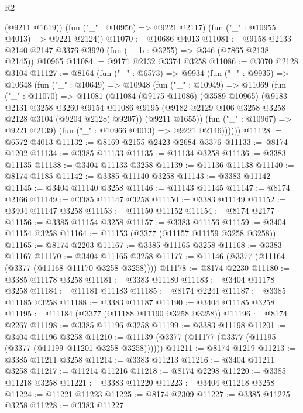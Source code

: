 \begin{lexlean}{R2}
\begin{coremodule}
        (@9211 @1619))
      (fun ("_" : @10956) => @9221 @2117)
      (fun ("_" : @10955 @4013) => @9221 @2124))
@11070 := @10686 @4013
@11081 := @9158 @2133 @2140 @2147 @3376 @3920 (fun (__b : @3255) => @346 (@7865 @2138 @2145)) @10965
@11084 := @9171 @2132 @3374 @3258
@11086 := @3070 @2128 @3104
@11127 := @8164
    (fun ("_" : @6573) =>
    @9934
      (fun ("_" : @9935) =>
      @10648
        (fun ("_" : @10649) =>
        @10948
          (fun ("_" : @10949) =>
          @11069
            (fun ("_" : @11070) =>
            @11081
              (@11084
                (@9175 @11086)
                (@3589 @10965)
                (@9183
                  @2131
                  @3258
                  @3260
                  @9154
                  @11086
                  @9195
                  (@9182 @2129 @106 @3258 @3258 @2128 @3104 (@9204 @2128) @9207))
                (@9211 @1655))
              (fun ("_" : @10967) => @9221 @2139)
              (fun ("_" : @10966 @4013) => @9221 @2146))))))
@11128 := @6572 @4013
@11132 := @8169 @2155 @2423 @2684 @3376
@11133 := @8174 @1202
@11134 := @3385 @11133
@11135 := @11134 @3258
@11136 := @3383 @11135
@11138 := @3404 @11133 @3258
@11139 := @11136 @11138
@11140 := @8174 @1185
@11142 := @3385 @11140 @3258
@11143 := @3383 @11142
@11145 := @3404 @11140 @3258
@11146 := @11143 @11145
@11147 := @8174 @2166
@11149 := @3385 @11147 @3258
@11150 := @3383 @11149
@11152 := @3404 @11147 @3258
@11153 := @11150 @11152
@11154 := @8174 @2177
@11156 := @3385 @11154 @3258
@11157 := @3383 @11156
@11159 := @3404 @11154 @3258
@11164 := @11153 (@3377 (@11157 @11159 @3258 @3258))
@11165 := @8174 @2203
@11167 := @3385 @11165 @3258
@11168 := @3383 @11167
@11170 := @3404 @11165 @3258
@11177 := @11146 (@3377 (@11164 (@3377 (@11168 @11170 @3258 @3258))))
@11178 := @8174 @2230
@11180 := @3385 @11178 @3258
@11181 := @3383 @11180
@11183 := @3404 @11178 @3258
@11184 := @11181 @11183
@11185 := @8174 @2241
@11187 := @3385 @11185 @3258
@11188 := @3383 @11187
@11190 := @3404 @11185 @3258
@11195 := @11184 (@3377 (@11188 @11190 @3258 @3258))
@11196 := @8174 @2267
@11198 := @3385 @11196 @3258
@11199 := @3383 @11198
@11201 := @3404 @11196 @3258
@11210 := @11139 (@3377 (@11177 (@3377 (@11195 (@3377 (@11199 @11201 @3258 @3258))))))
@11211 := @8174 @1219
@11213 := @3385 @11211 @3258
@11214 := @3383 @11213
@11216 := @3404 @11211 @3258
@11217 := @11214 @11216
@11218 := @8174 @2298
@11220 := @3385 @11218 @3258
@11221 := @3383 @11220
@11223 := @3404 @11218 @3258
@11224 := @11221 @11223
@11225 := @8174 @2309
@11227 := @3385 @11225 @3258
@11228 := @3383 @11227

\end{coremodule}
\end{lexlean}
